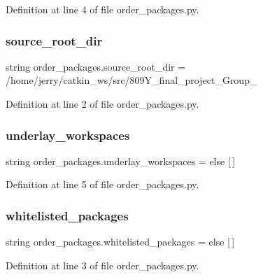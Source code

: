 Definition at line 4 of file order\+\_\+packages.\+py.

\mbox{\label{namespaceorder__packages_aff4fd297841de7fbddc2c0c33a6bab21}} 
\subsubsection{\texorpdfstring{source\+\_\+root\+\_\+dir}{source\_root\_dir}}
{\footnotesize\ttfamily string order\+\_\+packages.\+source\+\_\+root\+\_\+dir = \textquotesingle{}/home/jerry/catkin\+\_\+ws/src/809\+Y\+\_\+final\+\_\+project\+\_\+\+Group\+\_\textquotesingle{}}



Definition at line 2 of file order\+\_\+packages.\+py.

\mbox{\label{namespaceorder__packages_a11d102ff09fd2977b9075c4c722015d2}} 
\subsubsection{\texorpdfstring{underlay\+\_\+workspaces}{underlay\_workspaces}}
{\footnotesize\ttfamily string order\+\_\+packages.\+underlay\+\_\+workspaces = \textquotesingle{}\textquotesingle{} else \mbox{[}$\,$\mbox{]}}



Definition at line 5 of file order\+\_\+packages.\+py.

\mbox{\label{namespaceorder__packages_a84450a73e77dbf3689293b97dcb697a4}} 
\subsubsection{\texorpdfstring{whitelisted\+\_\+packages}{whitelisted\_packages}}
{\footnotesize\ttfamily string order\+\_\+packages.\+whitelisted\+\_\+packages = \textquotesingle{}\textquotesingle{} else \mbox{[}$\,$\mbox{]}}



Definition at line 3 of file order\+\_\+packages.\+py.


